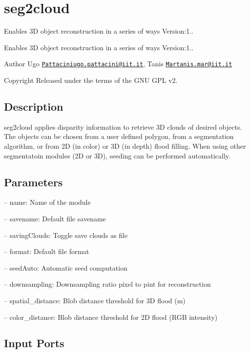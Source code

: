 \section{seg2cloud}
\label{group__seg2cloud}


Enables 3\-D object reconstruction in a series of ways Version\-:1..  


Enables 3\-D object reconstruction in a series of ways Version\-:1.. \begin{DoxyAuthor}{Author}
Ugo \href{mailto:Pattaciniugo.pattacini@iit.it}{\tt Pattaciniugo.\-pattacini@iit.\-it}, Tanis \href{mailto:Martanis.mar@iit.it}{\tt Martanis.\-mar@iit.\-it} \par
 
\end{DoxyAuthor}
\begin{DoxyCopyright}{Copyright}
Released under the terms of the G\-N\-U G\-P\-L v2. 
\end{DoxyCopyright}
\hypertarget{group__seg2cloud_intro_sec}{}\subsection{Description}\label{group__seg2cloud_intro_sec}
seg2cloud applies disparity information to retrieve 3\-D clouds of desired objects. The objects can be chosen from a user defined polygon, from a segmentation algorithm, or from 2\-D (in color) or 3\-D (in depth) flood filling. When using other segmentatoin modules (2\-D or 3\-D), seeding can be performed automatically.\hypertarget{group__seg2cloud_parameters_sec}{}\subsection{Parameters}\label{group__seg2cloud_parameters_sec}

\begin{DoxyItemize}
\item -- name\-: Name of the module
\item -- savename\-: Default file savename
\item -- saving\-Clouds\-: Toggle save clouds as file
\item -- format\-: Default file format
\item -- seed\-Auto\-: Automatic seed computation
\item -- downsampling\-: Downsampling ratio pixel to pint for reconstruction
\item -- spatial\-\_\-distance\-: Blob distance threshold for 3\-D flood (m)
\item -- color\-\_\-distance\-: Blob distance threshold for 2\-D flood (R\-G\-B intensity) 
\end{DoxyItemize}\hypertarget{group__seg2cloud_inputports_sec}{}\subsection{Input Ports}\label{group__seg2cloud_inputports_sec}

